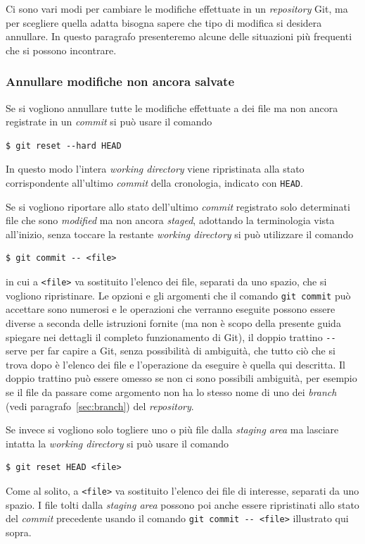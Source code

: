 \documentclass[a4paper,12pt,oneside]{article}
\begin{document}
Ci sono vari modi per cambiare le modifiche effettuate in un \emph{repository}
Git, ma per scegliere quella adatta bisogna sapere che tipo di modifica si
desidera annullare. In questo paragrafo presenteremo alcune delle situazioni più
frequenti che si possono incontrare.

\subsubsection{Annullare modifiche non ancora salvate}
\label{sec:annullare-modifiche-non-salvate}

Se si vogliono annullare tutte le modifiche effettuate a dei file ma non ancora
registrate in un \emph{commit} si può usare il comando
\begin{lstlisting}
$ git reset --hard HEAD
\end{lstlisting}
In questo modo l'intera \emph{working directory} viene ripristinata alla stato
corrispondente all'ultimo \emph{commit} della cronologia, indicato con
\lstinline|HEAD|.

Se si vogliono riportare allo stato dell'ultimo \emph{commit} registrato solo
determinati file che sono \emph{modified} ma non ancora \emph{staged}, adottando
la terminologia vista all'inizio, senza toccare la restante
\emph{working directory} si può utilizzare il comando
\begin{lstlisting}
$ git commit -- <file>
\end{lstlisting}
in cui a \lstinline|<file>| va sostituito l'elenco dei file, separati da uno
spazio, che si vogliono ripristinare. Le opzioni e gli argomenti che il comando
\lstinline|git commit| può accettare sono numerosi e le operazioni che verranno
eseguite possono essere diverse a seconda delle istruzioni fornite (ma non è
scopo della presente guida spiegare nei dettagli il completo funzionamento di
Git), il doppio trattino \lstinline|--| serve per far capire a Git, senza
possibilità di ambiguità, che tutto ciò che si trova dopo è l'elenco dei file e
l'operazione da eseguire è quella qui descritta. Il doppio trattino può essere
omesso se non ci sono possibili ambiguità, per esempio se il file da passare
come argomento non ha lo stesso nome di uno dei \emph{branch} (vedi
paragrafo~\ref{sec:branch}) del \emph{repository}.

Se invece si vogliono solo togliere uno o più file dalla \emph{staging area} ma
lasciare intatta la \emph{working directory} si può usare il comando
\begin{lstlisting}
$ git reset HEAD <file>
\end{lstlisting}
Come al solito, a \lstinline|<file>| va sostituito l'elenco dei file di
interesse, separati da uno spazio. I file tolti dalla \emph{staging area}
possono poi anche essere ripristinati allo stato del \emph{commit} precedente
usando il comando \lstinline|git commit -- <file>| illustrato qui sopra.
\end{document}
